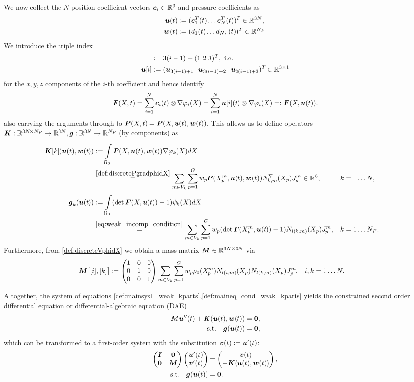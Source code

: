 We now collect the $N$ position coefficient vectors $\boldsymbol{c}_i \in\mathbb{R}^3$ and pressure coefficients as
\begin{align*}
	\boldsymbol{u}(t) &:= (\boldsymbol{c}_1^T(t) \ldots \boldsymbol{c}_N^T(t))^T \in\mathbb{R}^{3N},\\
	\boldsymbol{w}(t) &:= (d_1(t) \ldots d_{N_P}(t))^T \in\mathbb{R}^{N_P}.
\end{align*}
We introduce the triple index
\begin{align}
	[i] &:= 3(i-1)+(1~2~3)^T, \text{ i.e.}\\
	\vu[i] &:= (\vu_{3(i-1)+1}~~\vu_{3(i-1)+2}~~\vu_{3(i-1)+3})^T\in\R^{3\times 1}
\end{align}
for the $x,y,z$ components of the $i$-th coefficient and hence identify
\[
	\boldsymbol{F}(X,t) = \sum\limits_{i=1}^{N} \boldsymbol{c}_i(t)\otimes \nabla\varphi_i(X) = \sum\limits_{i=1}^{N} \boldsymbol{u}[i](t)\otimes \nabla\varphi_i(X) =: \boldsymbol{F}(X,\boldsymbol{u}(t)).
\]
also carrying the arguments through to $\boldsymbol{P}(X,t) = \boldsymbol{P}(X,\boldsymbol{u}(t),\boldsymbol{w}(t))$.
This allows us to define operators $\boldsymbol{K}: \mathbb{R}^{3N\times N_P}\to\mathbb{R}^{3N}, \boldsymbol{g}:\mathbb{R}^{3N}\to\mathbb{R}^{N_P}$ (by components) as
\begin{align}
	\vK[k](\vu(t),\vw(t)) &:= \intor\vP(X,\vu(t),\vw(t))\dpk dX\\
	&\re{def:discretePgradphidX} \sumvk\sumgp w_p\vP(\pmp,\vu(t),\vw(t))\dNkmp\jmp\in\R^3, && k=1\ldots N,\\
	\vg_k(\vu(t)) &:= \intor (\det\vF(X,\vu(t))-1)\psi_k(X)dX\\
	&\re{eq:weak_incomp_condition}\sumvk\sumgp w_p (\det\vF(\pmp,\vu(t))-1) \Nkmp\jmp, && k=1\ldots N_P.
\end{align}
Furthermore, from \eqref{def:discreteVphidX} we obtain a mass matrix $\boldsymbol{M}\in\mathbb{R}^{3N\times 3N}$ via
\begin{align*}
	\boldsymbol{M}\bigl[[i],[k]\bigr] &:= \left(\begin{matrix}1&0&0\\0&1&0\\0&0&1\end{matrix}\right) \sum\limits_{m\in V_k}^{}\sum\limits_{p=1}^{G} w_p \rho_0(X^m_p)N_{l(i,m)}(X_p) N_{l(k,m)}(X_p)J^m_p, && i,k=1\ldots N.
\end{align*}

Altogether, the system of equations \eqref{def:mainsys1_weak_kparts},\eqref{def:maineq_cond_weak_kparts} yields the constrained second order differential equation
or differential-algebraic equation (DAE)
\begin{align}
	\boldsymbol{M}\boldsymbol{u}''(t) + \boldsymbol{K}(\boldsymbol{u}(t),\boldsymbol{w}(t)) &= \boldsymbol{0},\\
		\text{s.t.}\quad \boldsymbol{g}(\boldsymbol{u}(t)) &= \boldsymbol{0},
\end{align}
which can be transformed to a first-order system with the substitution $\boldsymbol{v}(t) := \boldsymbol{u}'(t)$:
\begin{align}
	\left(\begin{matrix}\boldsymbol{I} & \boldsymbol{0}\\ \boldsymbol{0} & \boldsymbol{M}\end{matrix}\right)\left(\begin{matrix}\boldsymbol{u}'(t)\\ \boldsymbol{v}'(t)\end{matrix}\right) &= \left(\begin{matrix}\boldsymbol{v}(t) \\ -\boldsymbol{K}(\boldsymbol{u}(t),\boldsymbol{w}(t))\end{matrix}\right),\\
	\text{s.t.}\quad \boldsymbol{g}(\boldsymbol{u}(t))		&= \boldsymbol{0}.
\end{align}

